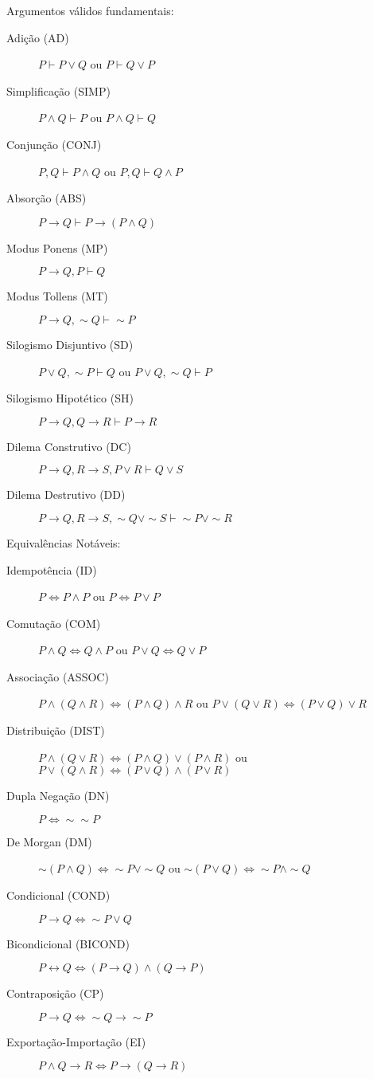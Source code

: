 \documentclass[12pt]{article}
\begin{document}
Argumentos válidos fundamentais:
\begin{description}
\item[Adição (AD)] $P \vdash P \vee Q$ ou $P \vdash Q \vee P$
\item[Simplificação (SIMP)] $P \wedge Q \vdash P$ ou $P \wedge Q \vdash Q$
\item[Conjunção (CONJ)] $P, Q \vdash P \wedge Q$ ou $P, Q \vdash Q \wedge P$
\item[Absorção (ABS)] $P \rightarrow Q \vdash P \rightarrow (P \wedge Q)$
\item[Modus Ponens (MP)] $P \rightarrow Q, P \vdash Q$
\item[Modus Tollens (MT)] $P \rightarrow Q, \sim Q \vdash \sim P$
\item[Silogismo Disjuntivo (SD)] $P \vee Q, \sim P \vdash Q$ ou $P \vee Q, \sim Q \vdash P$
\item[Silogismo Hipotético (SH)] $P \rightarrow Q, Q\rightarrow R \vdash P\rightarrow R$
\item[Dilema Construtivo (DC)] $P\rightarrow Q, R\rightarrow S, P \vee R \vdash Q\vee S$
\item[Dilema Destrutivo (DD)] $P\rightarrow Q, R\rightarrow S, \sim Q\vee\sim S \vdash \sim P \vee\sim R$
\end{description}

Equivalências Notáveis:
\begin{description}
\item[Idempotência (ID)] $P\Leftrightarrow P\wedge P$ ou $P\Leftrightarrow P\vee P$
\item[Comutação (COM)] $P\wedge Q\Leftrightarrow Q\wedge P$ ou $P\vee Q\Leftrightarrow Q\vee P$
\item[Associação (ASSOC)] $P\wedge(Q\wedge R)\Leftrightarrow (P\wedge Q)\wedge R$ ou $P\vee(Q\vee R)\Leftrightarrow (P\vee Q)\vee R$ 
\item[Distribuição (DIST)] $P\wedge(Q\vee R)\Leftrightarrow (P\wedge Q)\vee (P \wedge R)$ ou $P\vee(Q\wedge R)\Leftrightarrow (P\vee Q)\wedge (P\vee R)$
\item[Dupla Negação (DN)] $P\Leftrightarrow\sim\sim P$
\item[De Morgan (DM)] $\sim(P \wedge Q) \Leftrightarrow \sim P \vee\sim Q$ ou $\sim(P \vee Q) \Leftrightarrow \sim P \wedge\sim Q$
\item[Condicional (COND)] $P\rightarrow Q \Leftrightarrow\sim P \vee Q$
\item[Bicondicional (BICOND)] $P\leftrightarrow Q \Leftrightarrow (P\rightarrow Q)\wedge(Q\rightarrow P)$
\item[Contraposição (CP)] $P\rightarrow Q \Leftrightarrow \sim Q\rightarrow\sim P$
\item[Exportação-Importação (EI)] $P\wedge Q\rightarrow R \Leftrightarrow P\rightarrow(Q\rightarrow R)$
\end{description}
\end{document}

